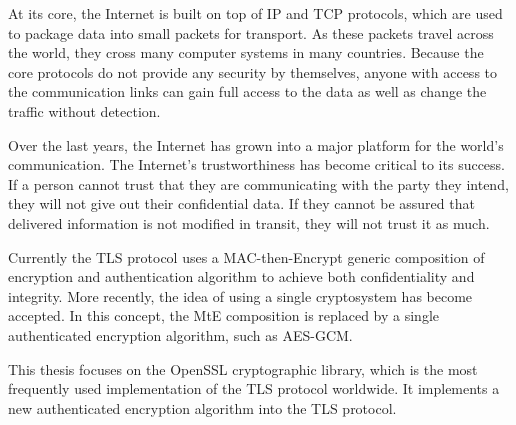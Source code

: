 \begin{introduction}

At its core, the Internet is built on top of IP and TCP protocols, which are used to package data into small packets for transport. As these packets travel across the world, they cross many computer systems in many countries. Because the core protocols do not provide any security by themselves, anyone with access to the communication links can gain full access to the data as well as change the traffic without detection.

Over the last years, the Internet has grown into a major platform for the world's communication. The Internet's trustworthiness has become critical to its success. If a person cannot trust that they are communicating with the party they intend, they will not give out their confidential data. If they cannot be assured that delivered information is not modified in transit, they will not trust it as much.

Currently the TLS protocol uses a MAC-then-Encrypt generic composition of encryption and authentication algorithm to achieve both confidentiality and integrity. More recently, the idea of using a single cryptosystem has become accepted. In this concept, the MtE composition is replaced by a single authenticated encryption algorithm, such as AES-GCM.

This thesis focuses on the OpenSSL cryptographic library, which is the most frequently used implementation of the TLS protocol worldwide. It implements a new authenticated encryption algorithm into the TLS protocol.

\end{introduction}
